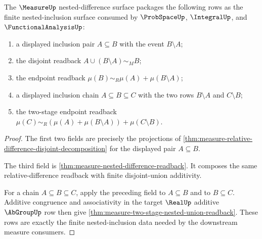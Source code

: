 \begin{theorem}
\label{thm:measure-nested-difference-package}
The $\MeasureUp$ nested-difference surface packages the following rows as the
finite nested-inclusion surface consumed by $\ProbSpaceUp$, $\IntegralUp$, and
$\FunctionalAnalysisUp$:
\begin{enumerate}
  \item a displayed inclusion pair $A\subseteq B$ with the event
  $B\setminus A$;
  \item the disjoint readback $A\cup(B\setminus A)\sim_M B$;
  \item the endpoint readback
  $\mu(B)\sim_R\mu(A)+\mu(B\setminus A)$;
  \item a displayed inclusion chain $A\subseteq B\subseteq C$ with the two
  rows $B\setminus A$ and $C\setminus B$;
  \item the two-stage endpoint readback
  $\mu(C)\sim_R(\mu(A)+\mu(B\setminus A))+\mu(C\setminus B)$.
\end{enumerate}
\end{theorem}
\begin{proof}
The first two fields are precisely the projections of
\autoref{thm:measure-relative-difference-disjoint-decomposition} for the
displayed pair $A\subseteq B$.

The third field is
\autoref{thm:measure-nested-difference-readback}. It composes the same
relative-difference readback with finite disjoint-union additivity.

For a chain $A\subseteq B\subseteq C$, apply the preceding field to
$A\subseteq B$ and to $B\subseteq C$. Additive congruence and associativity in
the target $\RealUp$ additive $\AbGroupUp$ row then give
\autoref{thm:measure-two-stage-nested-union-readback}. These rows are exactly
the finite nested-inclusion data needed by the downstream measure consumers.
\end{proof}
